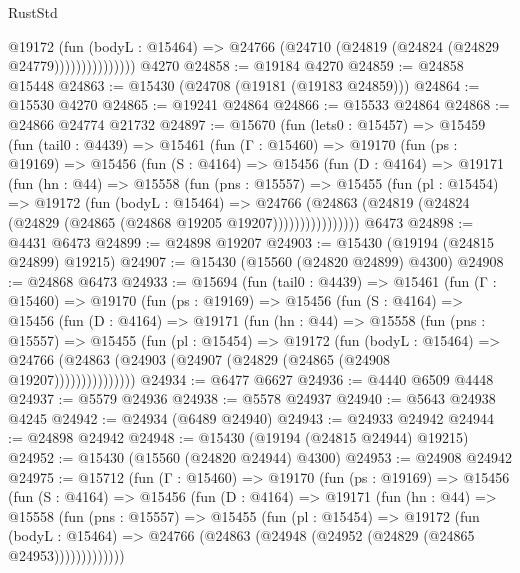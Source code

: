 \begin{lexlean}{RustStd}
\begin{coremodule}
{\begin{coremodule}
{{{{{{{{{{{{{{{{{{{{{{{{{{{{{{{{{{{{{{{{{{{{{{{{{{{{{{{{{{{{                      @19172
                        (fun (bodyL : @15464) =>
                        @24766 (@24710 (@24819 (@24824 (@24829 @24779)))))))))))))))
    @4270
@24858 := @19184 @4270
@24859 := @24858 @15448
@24863 := @15430 (@24708 (@19181 (@19183 @24859)))
@24864 := @15530 @4270
@24865 := @19241 @24864
@24866 := @15533 @24864
@24868 := @24866 @24774 @21732
@24897 := @15670
    (fun (lets0 : @15457) =>
    @15459
      (fun (tail0 : @4439) =>
      @15461
        (fun (Γ : @15460) =>
        @19170
          (fun (ps : @19169) =>
          @15456
            (fun (S : @4164) =>
            @15456
              (fun (D : @4164) =>
              @19171
                (fun (hn : @44) =>
                @15558
                  (fun (pns : @15557) =>
                  @15455
                    (fun (pl : @15454) =>
                    @19172
                      (fun (bodyL : @15464) =>
                      @24766
                        (@24863
                          (@24819 (@24824 (@24829 (@24865 (@24868 @19205 @19207))))))))))))))))
    @6473
@24898 := @4431 @6473
@24899 := @24898 @19207
@24903 := @15430 (@19194 (@24815 @24899) @19215)
@24907 := @15430 (@15560 (@24820 @24899) @4300)
@24908 := @24868 @6473
@24933 := @15694
    (fun (tail0 : @4439) =>
    @15461
      (fun (Γ : @15460) =>
      @19170
        (fun (ps : @19169) =>
        @15456
          (fun (S : @4164) =>
          @15456
            (fun (D : @4164) =>
            @19171
              (fun (hn : @44) =>
              @15558
                (fun (pns : @15557) =>
                @15455
                  (fun (pl : @15454) =>
                  @19172
                    (fun (bodyL : @15464) =>
                    @24766 (@24863 (@24903 (@24907 (@24829 (@24865 (@24908 @19207)))))))))))))))
@24934 := @6477 @6627
@24936 := @4440 @6509 @4448
@24937 := @5579 @24936
@24938 := @5578 @24937
@24940 := @5643 @24938 @4245
@24942 := @24934 (@6489 @24940)
@24943 := @24933 @24942
@24944 := @24898 @24942
@24948 := @15430 (@19194 (@24815 @24944) @19215)
@24952 := @15430 (@15560 (@24820 @24944) @4300)
@24953 := @24908 @24942
@24975 := @15712
    (fun (Γ : @15460) =>
    @19170
      (fun (ps : @19169) =>
      @15456
        (fun (S : @4164) =>
        @15456
          (fun (D : @4164) =>
          @19171
            (fun (hn : @44) =>
            @15558
              (fun (pns : @15557) =>
              @15455
                (fun (pl : @15454) =>
                @19172
                  (fun (bodyL : @15464) =>
                  @24766 (@24863 (@24948 (@24952 (@24829 (@24865 @24953)))))))))))))
}}}}}}}}}}}}}}}}}}}}}}}}}}}}}}}}}}}}}}}}}}}}}}}}}}}}}}}}}}}}
\end{coremodule}}
\end{coremodule}
\end{lexlean}
